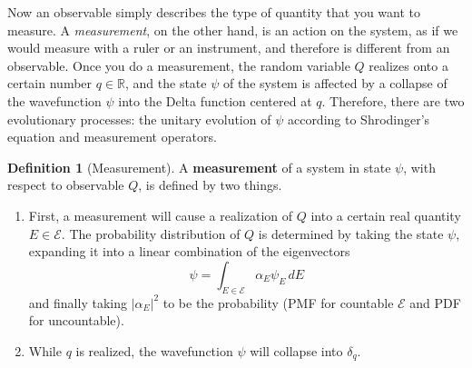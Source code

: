 \documentclass{article}
\theoremstyle{definition}
\newtheorem{definition}{Definition}[section]
\begin{document}
    Now an observable simply describes the type of quantity that you want to measure. A \textit{measurement}, on the other hand, is an action on the system, as if we would measure with a ruler or an instrument, and therefore is different from an observable. Once you do a measurement, the random variable $Q$ realizes onto a certain number $q \in \mathbb{R}$, and the state $\psi$ of the system is affected by a collapse of the wavefunction $\psi$ into the Delta function centered at $q$. Therefore, there are two evolutionary processes: the unitary evolution of $\psi$ according to Shrodinger's equation and measurement operators. 

    \begin{definition}[Measurement]
      A \textbf{measurement} of a system in state $\psi$, with respect to observable $Q$, is defined by two things. 
      \begin{enumerate} 
        \item First, a measurement will cause a realization of $Q$ into a certain real quantity $E \in \mathcal{E}$. The probability distribution of $Q$ is determined by taking the state $\psi$, expanding it into a linear combination of the eigenvectors 
        \begin{equation} 
          \psi = \int_{E \in \mathcal{E}}  \alpha_E \psi_E \,dE
        \end{equation}
        and finally taking $|\alpha_E|^2$ to be the probability (PMF for countable $\mathcal{E}$ and PDF for uncountable).  

        \item While $q$ is realized, the wavefunction $\psi$ will collapse into $\delta_q$. 
      \end{enumerate}
    \end{definition}
\end{document}
